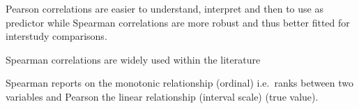 Pearson correlations are easier to understand, interpret and then to use as predictor
while Spearman correlations are more robust and thus better fitted for interstudy
comparisons.

Spearman correlations are widely used
within the literature~

Spearman reports on the monotonic relationship (ordinal) i.e.\ ranks between two variables and
Pearson the linear relationship (interval scale) (true value).

\begin{comment}
: explains the use of Spearman and Pearson
correlations along with 6 other statistical methods.
\end{comment}
